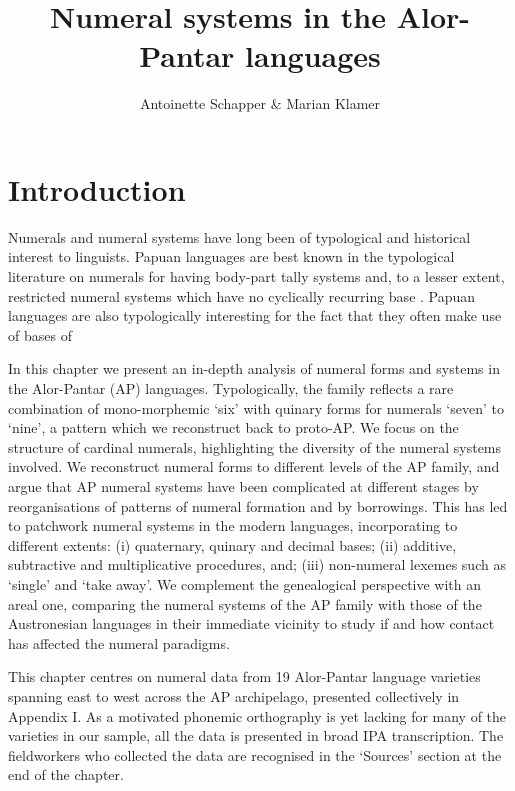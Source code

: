 \documentclass[output=paper]{LSP/langsci}
\title{Numeral systems in the Alor-Pantar languages}
\author{Antoinette Schapper \& Marian Klamer}
\begin{document}
\section{Introduction}

\hypertarget{Toc376958477}{}Numerals and numeral systems have long been of typological and historical interest to linguists. Papuan languages are best known in the typological literature on numerals for having body-part tally systems and, to a lesser extent, restricted numeral systems which have no cyclically recurring base{} \citep{Laycock1975,Lean1992,Comrie2005numsym}. Papuan languages are also typologically interesting for the fact that they often make use of bases of  

In this chapter we present an in-depth analysis of numeral forms and systems in the Alor-Pantar (AP) languages. Typologically, the family reflects a rare combination of mono-morphemic `six' with quinary forms for numerals `seven' to `nine', a pattern which we reconstruct back to proto-AP. We focus on the structure of cardinal numerals, highlighting the diversity of the numeral systems involved. We reconstruct numeral forms to different levels of the AP family, and argue that AP numeral systems have been complicated at different stages by reorganisations of patterns of numeral formation and by borrowings. This has led to patchwork numeral systems in the modern languages, incorporating to different extents: (i) quaternary, quinary and decimal bases; (ii) additive, subtractive and multiplicative procedures, and; (iii) non-numeral lexemes such as `single' and `take away'. We complement the genealogical perspective with an areal one, comparing the numeral systems of the AP family with those of the Austronesian languages in their immediate vicinity to study if and how contact has affected the numeral paradigms.

This chapter centres on numeral data from 19 Alor-Pantar language varieties spanning east to west across the AP archipelago, presented collectively in Appendix I. As a motivated phonemic orthography is yet lacking for many of the varieties in our sample, all the data is presented in broad IPA transcription. The fieldworkers who collected the data are recognised in the `Sources' section at the end of the chapter. 
\end{document}

